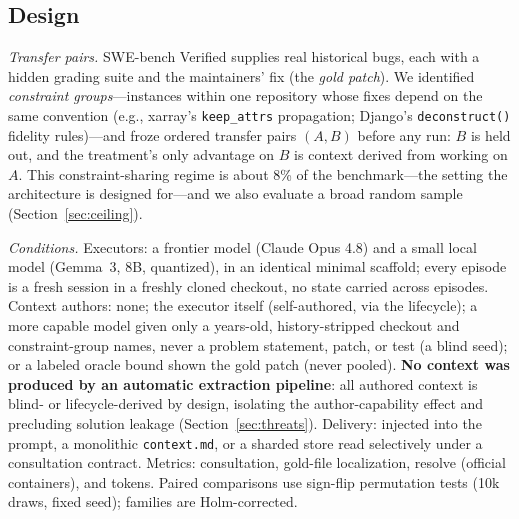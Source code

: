 \documentclass[sigconf,nonacm]{acmart}
\newcommand{\ctx}{\texttt{context.md}}
\begin{document}
\subsection{Design}
\emph{Transfer pairs.} SWE-bench Verified supplies real historical bugs, each with
a hidden grading suite and the maintainers' fix (the \emph{gold patch}). We
identified \emph{constraint groups}---instances within one repository whose fixes
depend on the same convention (e.g., xarray's \texttt{keep\_attrs} propagation;
Django's \texttt{deconstruct()} fidelity rules)---and froze ordered transfer pairs
$(A,B)$ before any run: $B$ is held out, and the treatment's only advantage on $B$
is context derived from working on $A$. This constraint-sharing regime is about
8\% of the benchmark---the setting the architecture is designed for---and we also
evaluate a broad random sample (Section~\ref{sec:ceiling}).

\emph{Conditions.} Executors: a frontier model (Claude Opus 4.8) and a small local
model (Gemma~3, 8B, quantized), in an identical minimal scaffold; every episode is
a fresh session in a freshly cloned checkout, no state carried across episodes.
Context authors: none; the executor itself (self-authored, via the lifecycle); a
more capable model given only a years-old, history-stripped checkout and
constraint-group names, never a problem statement, patch, or test (a blind seed);
or a labeled oracle bound shown the gold patch (never pooled). \textbf{No context
was produced by an automatic extraction pipeline}: all authored context is blind-
or lifecycle-derived by design, isolating the author-capability effect and
precluding solution leakage (Section~\ref{sec:threats}). Delivery: injected into
the prompt, a monolithic \ctx{}, or a sharded store read selectively under a
consultation contract. Metrics: consultation, gold-file localization, resolve
(official containers), and tokens. Paired comparisons use sign-flip permutation
tests (10k draws, fixed seed); families are Holm-corrected.
\end{document}
